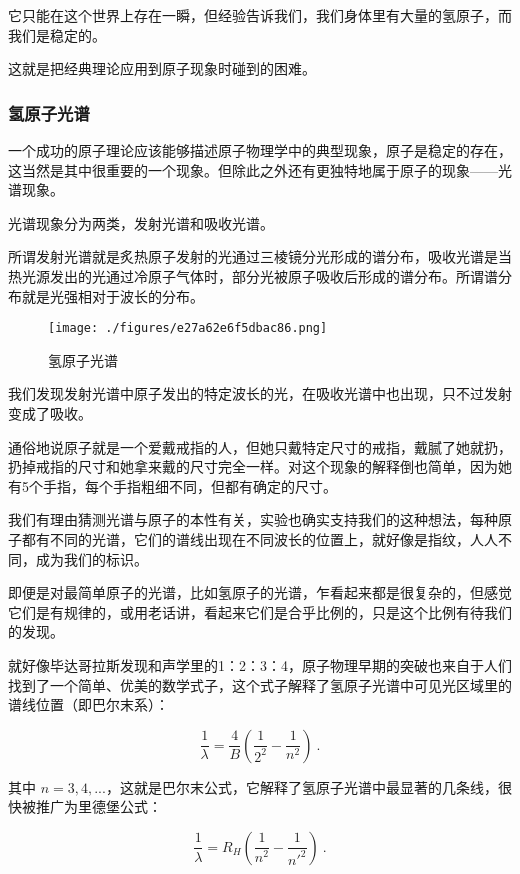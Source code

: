 它只能在这个世界上存在一瞬，但经验告诉我们，我们身体里有大量的氢原子，而我们是稳定的。

这就是把经典理论应用到原子现象时碰到的困难。

\subsubsection{氢原子光谱}


一个成功的原子理论应该能够描述原子物理学中的典型现象，原子是稳定的存在，这当然是其中很重要的一个现象。但除此之外还有更独特地属于原子的现象——光谱现象。

光谱现象分为两类，发射光谱和吸收光谱。

所谓发射光谱就是炙热原子发射的光通过三棱镜分光形成的谱分布，吸收光谱是当热光源发出的光通过冷原子气体时，部分光被原子吸收后形成的谱分布。所谓谱分布就是光强相对于波长的分布。

\begin{figure}[ht]
\centering
\texttt{[image: ./figures/e27a62e6f5dbac86.png]}
\caption{氢原子光谱} \label{fig_ClBohr_6}
\end{figure}


我们发现发射光谱中原子发出的特定波长的光，在吸收光谱中也出现，只不过发射变成了吸收。

通俗地说原子就是一个爱戴戒指的人，但她只戴特定尺寸的戒指，戴腻了她就扔，扔掉戒指的尺寸和她拿来戴的尺寸完全一样。对这个现象的解释倒也简单，因为她有5个手指，每个手指粗细不同，但都有确定的尺寸。

我们有理由猜测光谱与原子的本性有关，实验也确实支持我们的这种想法，每种原子都有不同的光谱，它们的谱线出现在不同波长的位置上，就好像是指纹，人人不同，成为我们的标识。

即便是对最简单原子的光谱，比如氢原子的光谱，乍看起来都是很复杂的，但感觉它们是有规律的，或用老话讲，看起来它们是合乎比例的，只是这个比例有待我们的发现。

就好像毕达哥拉斯发现和声学里的1：2：3：4，原子物理早期的突破也来自于人们找到了一个简单、优美的数学式子，这个式子解释了氢原子光谱中可见光区域里的谱线位置（即巴尔末系）：

\begin{equation}
\frac{1}{\lambda} = \frac{4}{B} \left( \frac{1}{2^2} - \frac{1}{n^2} \right)~.
\end{equation}

其中 $n = 3, 4, ...$，这就是巴尔末公式，它解释了氢原子光谱中最显著的几条线，很快被推广为里德堡公式：

\begin{equation}
\frac{1}{\lambda} = R_H \left(  \frac{1}{n^2} - \frac{1}{n'^2}  \right)~.
\end{equation}

